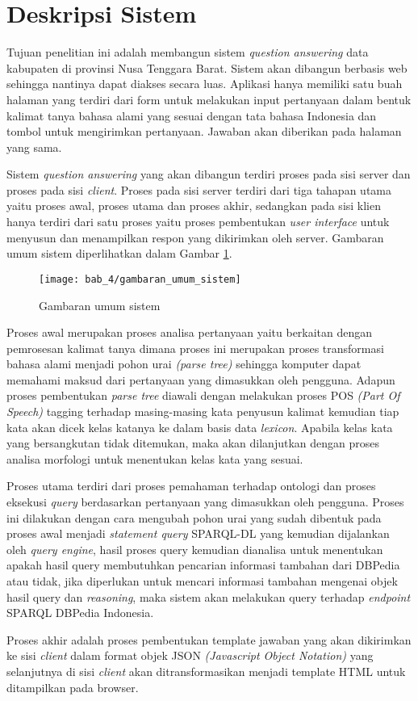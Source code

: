 \section{Deskripsi Sistem}
Tujuan penelitian ini adalah membangun sistem \emph{question answering} data kabupaten di provinsi Nusa Tenggara Barat. Sistem akan dibangun berbasis web sehingga nantinya dapat diakses secara luas. Aplikasi hanya memiliki satu buah halaman yang terdiri dari form untuk melakukan input pertanyaan dalam bentuk kalimat tanya bahasa alami yang sesuai dengan tata bahasa Indonesia dan tombol untuk mengirimkan pertanyaan. Jawaban akan diberikan pada halaman yang sama. 

Sistem \emph{question answering} yang akan dibangun terdiri proses pada sisi server dan proses pada sisi \emph{client}. Proses pada sisi server terdiri dari tiga tahapan utama yaitu proses awal, proses utama dan proses akhir, sedangkan pada sisi klien hanya terdiri dari satu proses yaitu proses pembentukan \emph{user interface} untuk menyusun dan menampilkan respon yang dikirimkan oleh server. Gambaran umum sistem diperlihatkan dalam Gambar \ref{fig:gambaran_umum_sistem}.

\begin{figure}[th]
	\centering
	\texttt{[image: bab\_4/gambaran\_umum\_sistem]}
	\caption{Gambaran umum sistem}
	\label{fig:gambaran_umum_sistem}
\end{figure}

Proses awal merupakan proses analisa pertanyaan yaitu berkaitan dengan pemrosesan kalimat tanya dimana proses ini merupakan proses transformasi bahasa alami menjadi pohon urai \emph{(parse tree)} sehingga komputer dapat memahami maksud dari pertanyaan yang dimasukkan oleh pengguna. Adapun proses pembentukan \emph{parse tree} diawali dengan melakukan proses POS \emph{(Part Of Speech)} tagging terhadap masing-masing kata penyusun kalimat kemudian tiap kata akan dicek kelas katanya ke dalam basis data \emph{lexicon}. Apabila kelas kata yang bersangkutan tidak ditemukan, maka akan dilanjutkan dengan proses analisa morfologi untuk menentukan kelas kata yang sesuai.

Proses utama terdiri dari proses pemahaman terhadap ontologi dan proses eksekusi \emph{query} berdasarkan pertanyaan yang dimasukkan oleh pengguna. Proses ini dilakukan dengan cara mengubah pohon urai yang sudah dibentuk pada proses awal menjadi \emph{statement query} SPARQL-DL yang kemudian dijalankan oleh \emph{query engine}, hasil proses query kemudian dianalisa untuk menentukan apakah hasil query membutuhkan pencarian informasi tambahan dari DBPedia atau tidak, jika diperlukan untuk mencari informasi tambahan mengenai objek hasil query dan \emph{reasoning}, maka sistem akan melakukan query terhadap \emph{endpoint} SPARQL DBPedia Indonesia. 

Proses akhir adalah proses pembentukan template jawaban yang akan dikirimkan ke sisi \emph{client} dalam format objek JSON \emph{(Javascript Object Notation)} yang selanjutnya di sisi \emph{client} akan ditransformasikan menjadi template HTML untuk ditampilkan pada browser.
